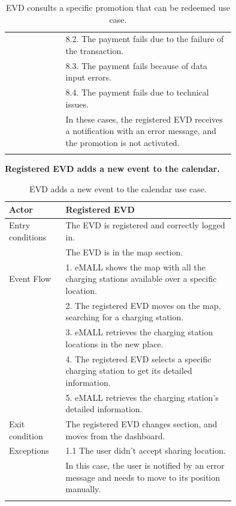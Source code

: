 \begin{center}
\begin{longtable}{lp{0.75\linewidth}}
        & 8.2. The payment fails due to the failure of the transaction.                                                         \\
        & 8.3. The payment fails because of data input errors.                                                                   \\
        & 8.4. The payment fails due to technical issues.                                                                       \\
        & In these cases, the registered EVD receives a notification with an error message, and the promotion is not activated. \\
        \hline
        \caption{EVD consults a specific promotion that can be redeemed use case.}
        \label{tab: EVD_consults_promotion_use_case}
    \end{longtable}
\end{center}

\textbf{Registered EVD adds a new event to the calendar.}
\begin{center}
    \begin{longtable}{lp{0.75\linewidth}}
        \hline
        Actor            & Registered EVD                                                                                     \\
        \hline
        Entry conditions & The EVD is registered and correctly logged in.                                                     \\
        & The EVD is in the map section.                                                                     \\
        \hline
        Event Flow       & 1. eMALL shows the map with all the charging stations available over a specific location.          \\
        & 2. The registered EVD moves on the map, searching for a charging station.                          \\
        & 3. eMALL retrieves the charging station locations in the new place.                                \\
        & 4. The registered EVD selects a specific charging station to get its detailed information.         \\
        & 5. eMALL retrieves the charging station's detailed information.                                    \\
        \hline
        Exit condition   & The registered EVD changes section, and moves from the dashboard.                                  \\
        \hline
        Exceptions       & 1.1 The user didn’t accept sharing location.                                                       \\
        & In this case, the user is notified by an error message and needs to move to its position manually. \\
        \hline
        \caption{EVD adds a new event to the calendar use case.}
        \label{tab: EVD_adds_event_use_case}
    \end{longtable}
\end{center}

